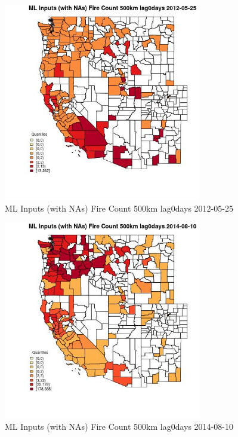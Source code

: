 \begin{figure} 
\centering  
\includegraphics[width=0.77\textwidth]{Code_Outputs/Report_ML_input_PM25_Step4_part_e_de_duplicated_aves_compiled_2019-05-18wNAs_CountyFire_Count_500km_lag0daysMean2012-05-25_2012-05-25.jpg} 
\caption{\label{fig:Report_ML_input_PM25_Step4_part_e_de_duplicated_aves_compiled_2019-05-18wNAsCountyFire_Count_500km_lag0daysMean2012-05-25_2012-05-25}ML Inputs (with NAs) Fire Count 500km lag0days 2012-05-25} 
\end{figure} 
 

\begin{figure} 
\centering  
\includegraphics[width=0.77\textwidth]{Code_Outputs/Report_ML_input_PM25_Step4_part_e_de_duplicated_aves_compiled_2019-05-18wNAs_CountyFire_Count_500km_lag0daysMean2014-08-10_2014-08-10.jpg} 
\caption{\label{fig:Report_ML_input_PM25_Step4_part_e_de_duplicated_aves_compiled_2019-05-18wNAsCountyFire_Count_500km_lag0daysMean2014-08-10_2014-08-10}ML Inputs (with NAs) Fire Count 500km lag0days 2014-08-10} 
\end{figure} 
 

